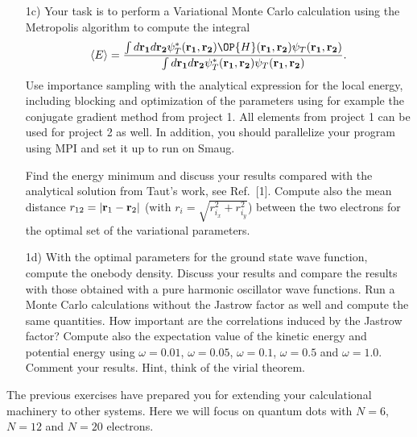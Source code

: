 \documentclass[10pt]{article}
\begin{document}
\begin{enumerate}
\item[1c)]
Your task is to perform a Variational Monte Carlo calculation
using the Metropolis algorithm to compute the integral
\begin{equation}
   \langle E \rangle =
   \frac{\int d{\bf r_1}d{\bf r_2}\psi^{\ast}_T({\bf r_1},{\bf r_2})\OP{H}({\bf r_1},{\bf r_2})\psi_T({\bf r_1},{\bf r_2})}
        {\int d{\bf r_1}d{\bf r_2}\psi^{\ast}_T({\bf r_1},{\bf r_2})\psi_T({\bf r_1},{\bf r_2})}.
\end{equation}
Use importance sampling with the analytical expression for the local energy, including blocking and 
optimization of the parameters using for example the conjugate gradient method from project 1. 
All elements from project 1 can be used for project 2 as well.
In addition, you should parallelize your program using MPI and set it up to run on Smaug.


Find the  energy minimum and discuss your results compared with the analytical solution from
Taut's work, see Ref.~[1]. Compute also the mean distance
$r_{12}=\vert {\bf r}_1-{\bf r}_2\vert$ (with $r_i = \sqrt{r_{i_x}^2+r_{i_y}^2}$) between the two electrons for the optimal set of the variational parameters.
\item[1d)]  With the optimal parameters for the ground state wave function, compute the onebody density. Discuss your results and compare the results with those obtained with a pure harmonic oscillator wave functions. Run a Monte Carlo calculations without the Jastrow factor as well
and compute the same quantities. How important are the correlations induced by the Jastrow factor?
Compute also the expectation value of the kinetic energy and potential energy using $\omega=0.01$, $\omega=0.05$,
$\omega=0.1$, $\omega=0.5$ and $\omega=1.0$. Comment your results. Hint, think of the virial theorem. 
\end{enumerate}
The previous exercises have prepared you for extending your calculational machinery  to other systems.
Here we will focus on quantum dots with $N=6$, $N=12$ and $N=20$ electrons.
\end{document}
